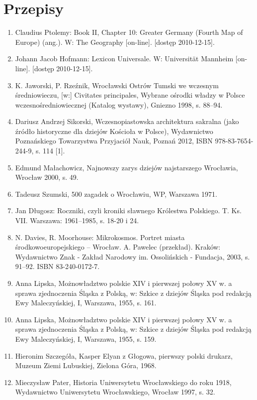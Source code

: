 \documentclass{article}
\begin{document}
\section{Przepisy}
\hrulefill

\begin{enumerate}
    \item  Claudius Ptolemy: Book II, Chapter 10: Greater Germany (Fourth Map of Europe) (ang.). W: The Geography [on-line]. [dostęp 2010-12-15].
    \item  Johann Jacob Hofmann: Lexicon Universale. W: Universität Mannheim [on-line]. [dostęp 2010-12-15].
    \item  K. Jaworski, P. Rzeźnik, Wrocławski Ostrów Tumski we wczesnym średniowieczu, [w:] Civitates principales, Wybrane ośrodki władzy w Polsce wczesnośredniowiecznej (Katalog wystawy), Gniezno 1998, s. 88–94.
    \item  Dariusz Andrzej Sikorski, Wczesnopiastowska architektura sakralna (jako źródło historyczne dla dziejów Kościoła w Polsce), Wydawnictwo Poznańskiego Towarzystwa Przyjaciół Nauk, Poznań 2012, ​ISBN 978-83-7654-244-9​, s. 114 [1].
    \item  Edmund Małachowicz, Najnowszy zarys dziejów najstarszego Wrocławia, Wrocław 2000, s. 49.
    \item Tadeusz Szumski, 500 zagadek o Wrocławiu, WP, Warszawa 1971. 
    \item  Jan Długosz: Roczniki, czyli kroniki sławnego Królestwa Polskiego. T. Ks. VII. Warszawa: 1961–1985, s. 18-20 i 24.
    \item  N. Davies, R. Moorhouse: Mikrokosmos. Portret miasta środkowoeuropejskiego – Wrocław. A. Pawelec (przekład). Kraków: Wydawnictwo Znak - Zakład Narodowy im. Ossolińskich - Fundacja, 2003, s. 91–92. ISBN 83-240-0172-7.
    \item  Anna Lipska, Możnowładztwo polskie XIV i pierwszej połowy XV w. a sprawa zjednoczenia Śląska z Polską, w: Szkice z dziejów Śląska pod redakcją Ewy Maleczyńskiej, I, Warszawa, 1955, s. 161.
    \item  Anna Lipska, Możnowładztwo polskie XIV i pierwszej połowy XV w. a sprawa zjednoczenia Śląska z Polską, w: Szkice z dziejów Śląska pod redakcją Ewy Maleczyńskiej, I, Warszawa, 1955, s. 159.
    \item  Hieronim Szczegóła, Kasper Elyan z Głogowa, pierwszy polski drukarz, Muzeum Ziemi Lubuskiej, Zielona Góra, 1968.
    \item  Mieczysław Pater, Historia Uniwersytetu Wrocławskiego do roku 1918, Wydawnictwo Uniwersytetu Wrocławskiego, Wrocław 1997, s. 32.

\end{enumerate}
\end{document}
